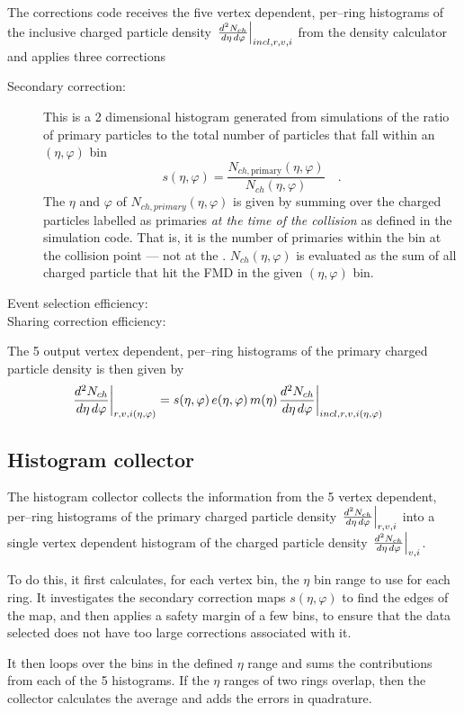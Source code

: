 \documentclass[11pt]{article}
\newcommand{\AbbrName}[1]{{\ifmmode\text{\scshape #1}\else{\scshape #1}\fi}}
\newcommand{\FMD}[1][]{\AbbrName{nsd\ifx|#1|\else#1\fi}}
\newcommand{\dndetadphi}[1][]{{\ensuremath%
    \ifx|#1|\else\left.\fi%
    \frac{d^2N_{ch}}{d\eta\,d\varphi}%
    \ifx|#1|\else\right|_{#1}\fi%
}}
\begin{document}
The corrections code receives the five vertex dependent,
per--ring histograms of the inclusive charged particle density
$\dndetadphi[incl,r,v,i]$ from the density calculator and applies
three corrections 
\begin{description}
\item[Secondary correction:] This is a 2 dimensional histogram
  generated from simulations of the ratio of primary particles to the
  total number of particles that fall within an $(\eta,\varphi)$ bin 
  $$
  s(\eta,\varphi) =
  \frac{N_{ch,\text{primary}}(\eta,\varphi)}{N_{ch}(\eta,\varphi)}\quad.
  $$
  The $\eta$ and $\varphi$ of $N_{ch,primary}(\eta,\varphi)$ is given
  by summing over the charged particles labelled as primaries \emph{at
    the time of the collision} as defined in the simulation code.
  That is, it is the number of primaries within the bin at the
  collision point --- not at the \FMD{}.  $N_{ch}(\eta,\varphi)$ is
  evaluated as the sum of all charged particle that hit the FMD in the
  given $(\eta,\varphi)$ bin.
\item[Event selection efficiency:]
\item[Sharing correction efficiency:] 
\end{description}

The 5 output vertex dependent, per--ring histograms of the primary
charged particle density is then given by
\begin{align}
  \dndetadphi[r,v,i(\eta,\varphi)] &= 
  s(\eta,\varphi)\,e(\eta,\varphi)\,m(\eta)\dndetadphi[incl,r,v,i(\eta,\varphi)]
\end{align}

\subsection*{Histogram collector}

The histogram collector collects the information from the 5 vertex
dependent, per--ring histograms of the primary charged particle
density $\dndetadphi[r,v,i]$ into a single vertex dependent histogram
of the charged particle density $\dndetadphi[v,i]$.  

To do this, it first calculates, for each vertex bin, the $\eta$ bin
range to use for each ring.  It investigates the secondary correction
maps $s(\eta,\varphi)$ to find the edges of the map, and then applies
a safety margin of a few bins, to ensure that the data selected does
not have too large corrections associated with it.  

It then loops over the bins in the defined $\eta$ range and sums the
contributions from each of the 5 histograms.   If the $\eta$ ranges of
two rings overlap, then the collector calculates the average and adds
the errors in quadrature. 
\end{document}
